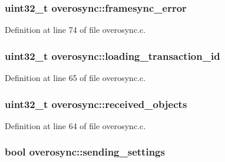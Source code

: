 \hypertarget{structoverosync_a628e392bbafa6a9bdac1085b68fc13bb}{
\subsubsection[{framesync\-\_\-error}]{\setlength{\rightskip}{0pt plus 5cm}uint32\-\_\-t {\bf overosync\-::framesync\-\_\-error}}}\label{structoverosync_a628e392bbafa6a9bdac1085b68fc13bb}


\-Definition at line 74 of file overosync.\-c.

\hypertarget{structoverosync_a92326e8268b02ad216b020f15bac9342}{
\subsubsection[{loading\-\_\-transaction\-\_\-id}]{\setlength{\rightskip}{0pt plus 5cm}uint32\-\_\-t {\bf overosync\-::loading\-\_\-transaction\-\_\-id}}}\label{structoverosync_a92326e8268b02ad216b020f15bac9342}


\-Definition at line 65 of file overosync.\-c.

\hypertarget{structoverosync_a44c38abb842382371674de5e2e1b55fe}{
\subsubsection[{received\-\_\-objects}]{\setlength{\rightskip}{0pt plus 5cm}uint32\-\_\-t {\bf overosync\-::received\-\_\-objects}}}\label{structoverosync_a44c38abb842382371674de5e2e1b55fe}


\-Definition at line 64 of file overosync.\-c.

\hypertarget{structoverosync_a7a7d310f38281bd01857a3a6e818f16e}{
\subsubsection[{sending\-\_\-settings}]{\setlength{\rightskip}{0pt plus 5cm}bool {\bf overosync\-::sending\-\_\-settings}}}\label{structoverosync_a7a7d310f38281bd01857a3a6e818f16e}



